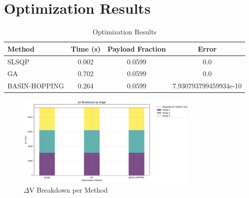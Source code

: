 \documentclass{article}
\begin{document}
\section{Optimization Results}
\begin{table}[h]
\centering
\begin{tabular}{|l|c|c|c|}
\hline
Method & Time (s) & Payload Fraction & Error \\
\hline
SLSQP & 0.002 & 0.0599 & 0.0 \\
GA & 0.702 & 0.0599 & 0.0 \\
BASIN-HOPPING & 0.264 & 0.0599 & 7.930793799459934e-10 \\
\hline
\end{tabular}
\caption{Optimization Results}
\end{table}
\begin{figure}[h]
\centering
\includegraphics[width=0.8\textwidth]{dv_breakdown.png}
\caption{$\Delta$V Breakdown per Method}
\end{figure}
\end{document}
